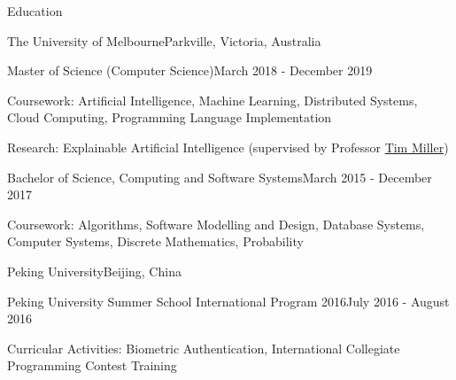 \documentclass{xsha}
\begin{document}
\address{
\textbf{Phone} +86 136******** $\cdot$\space
\textbf{Email} \href{mailto:luo@jiahai.co}{luo@jiahai.co} $\cdot$\space
\textbf{LinkedIn} \href{https://linkedin.com/in/luojiahai/}{in/luojiahai} $\cdot$\space
\textbf{GitHub} \href{https://github.com/luojiahai/}{luojiahai} $\cdot$\space
\textbf{Site} \href{https://luojiahai.com/}{luojiahai.com}
}

\begin{xsection}{Education}

\begin{xheading}{The University of Melbourne}{Parkville, Victoria, Australia}
\begin{xsubheading}{Master of Science (Computer Science)}{March 2018 - December 2019}
\item Coursework: Artificial Intelligence, Machine Learning, Distributed Systems, Cloud Computing, Programming Language Implementation
\item Research: Explainable Artificial Intelligence (supervised by Professor \href{https://eecs.uq.edu.au/profile/9477/tim-miller}{Tim Miller})
\end{xsubheading}
\begin{xsubheading}{Bachelor of Science, Computing and Software Systems}{March 2015 - December 2017}
\item Coursework: Algorithms, Software Modelling and Design, Database Systems, Computer Systems, Discrete Mathematics, Probability
\end{xsubheading}
\end{xheading}

\begin{xheading}{Peking University}{Beijing, China}
\begin{xsubheading}{Peking University Summer School International Program 2016}{July 2016 - August 2016}
\item Curricular Activities: Biometric Authentication, International Collegiate Programming Contest Training
\end{xsubheading}
\end{xheading}

\end{xsection}
\end{document}
